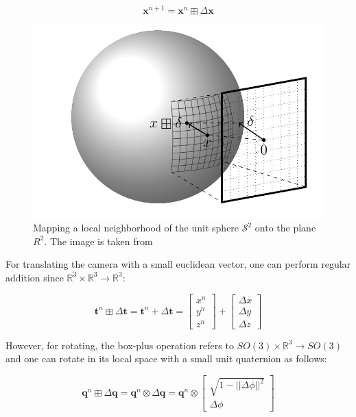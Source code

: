 \documentclass[a4paper]{report}
\numberwithin{figure}{section}
\newcommand{\R}{\mathbb{R}}
\begin{document}
\begin{equation}
  \mathbf{x}^{n+1} = \mathbf{x}^{n} \boxplus \Delta \mathbf{x}
\end{equation}

\begin{figure}[H]
	\centering
  \includegraphics[width=0.5\linewidth,natwidth=640,natheight=640]
  {fig/ref_imgs/sphere_manifold.png}
  \caption[A Sphere Manifold]
  {Mapping a local neighborhood of the unit sphere $\mathcal{S}^2$ 
  onto the plane $R^2$. The image is taken from \parencite{Hertzberg2013}}
	\label{fig:manifold}
\end{figure}


For translating the camera with a small euclidean vector, 
one can perform regular addition since $\R^3 \times \R^3 \rightarrow \R^3$:

\begin{equation}
  \mathbf{t}^n \boxplus \Delta \mathbf{t} = 
  \mathbf{t}^n + \Delta \mathbf{t} =
  \begin{bmatrix} x^{n} \\ y^{n} \\ z^{n} \end{bmatrix} + 
  \begin{bmatrix} \Delta x \\ \Delta y \\ \Delta z \end{bmatrix}
\end{equation}

However, for rotating, the box-plus operation refers to 
$SO(3) \times \R^3 \rightarrow SO(3)$ and one can rotate in its local space 
with a small unit quaternion as follows:

\begin{equation}
  \mathbf{q}^n \boxplus \Delta \mathbf{q} = 
  \mathbf{q}^n \otimes \Delta \mathbf{q} = 
  \mathbf{q}^n \otimes 
  \begin{bmatrix} \sqrt{1-||\Delta \phi||^2} \\ \Delta \phi \end{bmatrix}
\end{equation}
\end{document}
